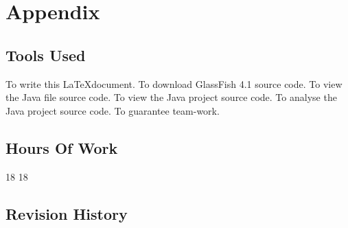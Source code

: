 \section{Appendix}

\subsection{Tools Used}
\begin{enumerate}
	 To write this \LaTeX document.
	 To download GlassFish 4.1 source code.
	 To view the Java file source code.
	 To view the Java project source code.
	 To analyse the Java project source code.
	 To guarantee team-work.
\end{enumerate}


\subsection{Hours Of Work}
\begin{itemize}
	 18
	 18
\end{itemize}

\subsection{Revision History}
